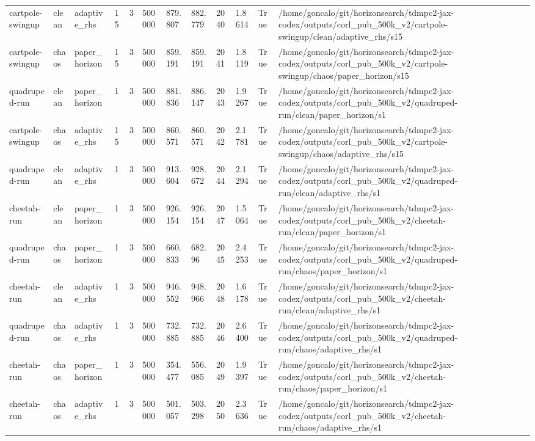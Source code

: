 \begin{tabular}{llllllllllll}
cartpole-swingup & clean & adaptive\_rhs & 15 & 3 & 500000 & 879.807 & 882.779 & 2040 & 1.8614 & True & /home/goncalo/git/horizonsearch/tdmpc2-jax-codex/outputs/corl\_pub\_500k\_v2/cartpole-swingup/clean/adaptive\_rhs/s15 \\
cartpole-swingup & chaos & paper\_horizon & 15 & 3 & 500000 & 859.191 & 859.191 & 2041 & 1.8119 & True & /home/goncalo/git/horizonsearch/tdmpc2-jax-codex/outputs/corl\_pub\_500k\_v2/cartpole-swingup/chaos/paper\_horizon/s15 \\
quadruped-run & clean & paper\_horizon & 1 & 3 & 500000 & 881.836 & 886.147 & 2043 & 1.9267 & True & /home/goncalo/git/horizonsearch/tdmpc2-jax-codex/outputs/corl\_pub\_500k\_v2/quadruped-run/clean/paper\_horizon/s1 \\
cartpole-swingup & chaos & adaptive\_rhs & 15 & 3 & 500000 & 860.571 & 860.571 & 2042 & 2.1781 & True & /home/goncalo/git/horizonsearch/tdmpc2-jax-codex/outputs/corl\_pub\_500k\_v2/cartpole-swingup/chaos/adaptive\_rhs/s15 \\
quadruped-run & clean & adaptive\_rhs & 1 & 3 & 500000 & 913.604 & 928.672 & 2044 & 2.1294 & True & /home/goncalo/git/horizonsearch/tdmpc2-jax-codex/outputs/corl\_pub\_500k\_v2/quadruped-run/clean/adaptive\_rhs/s1 \\
cheetah-run & clean & paper\_horizon & 1 & 3 & 500000 & 926.154 & 926.154 & 2047 & 1.5064 & True & /home/goncalo/git/horizonsearch/tdmpc2-jax-codex/outputs/corl\_pub\_500k\_v2/cheetah-run/clean/paper\_horizon/s1 \\
quadruped-run & chaos & paper\_horizon & 1 & 3 & 500000 & 660.833 & 682.96 & 2045 & 2.4253 & True & /home/goncalo/git/horizonsearch/tdmpc2-jax-codex/outputs/corl\_pub\_500k\_v2/quadruped-run/chaos/paper\_horizon/s1 \\
cheetah-run & clean & adaptive\_rhs & 1 & 3 & 500000 & 946.552 & 948.966 & 2048 & 1.6178 & True & /home/goncalo/git/horizonsearch/tdmpc2-jax-codex/outputs/corl\_pub\_500k\_v2/cheetah-run/clean/adaptive\_rhs/s1 \\
quadruped-run & chaos & adaptive\_rhs & 1 & 3 & 500000 & 732.885 & 732.885 & 2046 & 2.6400 & True & /home/goncalo/git/horizonsearch/tdmpc2-jax-codex/outputs/corl\_pub\_500k\_v2/quadruped-run/chaos/adaptive\_rhs/s1 \\
cheetah-run & chaos & paper\_horizon & 1 & 3 & 500000 & 354.477 & 556.085 & 2049 & 1.9397 & True & /home/goncalo/git/horizonsearch/tdmpc2-jax-codex/outputs/corl\_pub\_500k\_v2/cheetah-run/chaos/paper\_horizon/s1 \\
cheetah-run & chaos & adaptive\_rhs & 1 & 3 & 500000 & 501.057 & 503.298 & 2050 & 2.3636 & True & /home/goncalo/git/horizonsearch/tdmpc2-jax-codex/outputs/corl\_pub\_500k\_v2/cheetah-run/chaos/adaptive\_rhs/s1 \\

\end{tabular}
